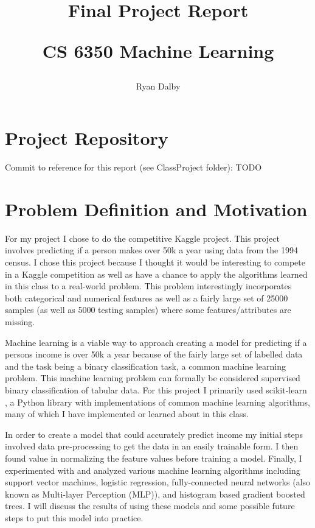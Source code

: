 \documentclass[11pt]{article}
\title{
    Final Project Report

    \large{
    CS 6350 Machine Learning
    }  
    
}
\author{
    Ryan Dalby
}
\date{\displaydate{date}}
\begin{document}
\maketitle

\section*{Project Repository}
Commit to reference for this report (see ClassProject folder): TODO \url{}

\section*{Problem Definition and Motivation}

For my project I chose to do the competitive Kaggle project.
This project involves predicting if a person makes over 50k a year using data from the 1994 census. 
I chose this project because I thought it would be interesting to compete in a Kaggle competition as well as have a chance to apply the algorithms learned in this class to a real-world problem.
This problem interestingly incorporates both categorical and numerical features as well as a fairly large set of 25000 samples (as well as 5000 testing samples) where some features/attributes are missing.

Machine learning is a viable way to approach creating a model for predicting if a persons income is over 50k a year because of the fairly large set of labelled data and the task being a binary classification task, a common machine learning problem.
This machine learning problem can formally be considered supervised binary classification of tabular data. 
For this project I primarily used scikit-learn \cite{noauthor_scikit-learn_nodate}, a Python library with implementations of common machine learning algorithms, many of which I have implemented or learned about in this class.

In order to create a model that could accurately predict income my initial steps involved data pre-processing to get the data in an easily trainable form.
I then found value in normalizing the feature values before training a model.
Finally, I experimented with and analyzed various machine learning algorithms including support vector machines, logistic regression, fully-connected neural networks (also known as Multi-layer Perception (MLP)), and histogram based gradient boosted trees.
I will discuss the results of using these models and some possible future steps to put this model into practice.
\end{document}
